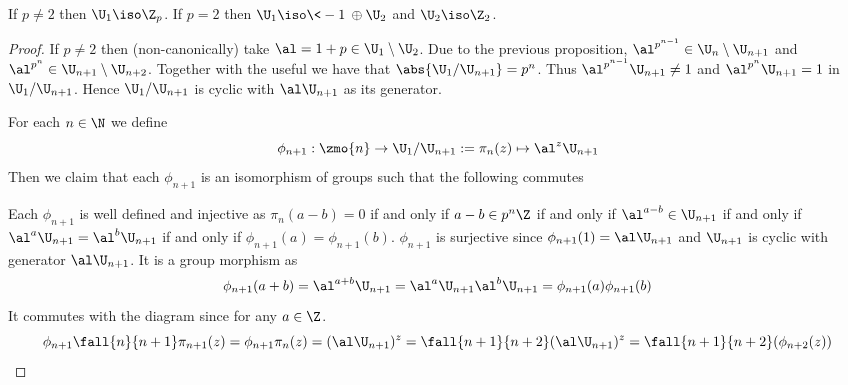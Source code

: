 \begin{prop}[Decomposition of $\U_1$]
    If $p \ne 2$ then $\U_1 \iso \Z_p$.
    If $p = 2$ then $\U_1 \iso \<-1\>\oplus \U_2$ 
    and $\U_2 \iso \Z_2$.
\end{prop}
\begin{proof}
    If $p \ne 2$ then (non-canonically) take 
    $\al = 1 + p \in \U_1 \setminus \U_2$.
    Due to the previous proposition, 
    $\al^{p^{n-1}} \in \U_{n} \setminus \U_{n+1}$
    and $\al^{p^n} \in \U_{n+1} \setminus \U_{n+2}$.
    Together with the useful 
    we have that $\abs{\U_1 / \U_{n+1}} = p^n$.
    Thus $\al^{p^{n-1}} \U_{n+1} \ne 1$
    and $\al^{p^n} \U_{n+1} = 1$ in $\U_1 / \U_{n+1}$.
    Hence $\U_1 / \U_{n+1}$ is cyclic with $\al \U_{n+1}$
    as its generator.

    For each $n \in \N$ we define 
    \[\phi_{n+1} : \zmo{n} \to \U_1 / \U_{n+1}
    : = \pi_n(z) \mapsto \al^z \U_{n+1}\]
    Then we claim that each $\phi_{n+1}$ 
    is an isomorphism of groups such that the following 
    commutes 
    \begin{center}
    \end{center}
    Each $\phi_{n+1}$ is well defined and injective as 
    $\pi_n(a - b) = 0$ if and only if $a - b \in p^n \Z$
    if and only if $\al^{a - b} \in \U_{n+1}$
    if and only if $\al^{a}\U_{n+1} = \al^{b}\U_{n+1}$
    if and only if $\phi_{n+1}(a) = \phi_{n+1}(b)$.
    $\phi_{n+1}$ is surjective since $\phi_{n+1}(1) = \al \U_{n+1}$
    and $\U_{n+1}$ is cyclic with generator $\al \U_{n+1}$.
    It is a group morphism as
    \[\phi_{n+1}(a+b) = \al^{a+b} \U_{n+1}= 
    \al^{a} \U_{n+1} \al^b \U_{n+1}= 
    \phi_{n+1}(a)\phi_{n+1}(b)\]
    It commutes with the diagram since for any $a \in \Z$.
    \[\phi_{n+1} \fall{n}{n+1} \pi_{n+1}(z) = 
    \phi_{n+1} \pi_{n}(z) = 
    (\al \U_{n+1})^z = 
    \fall{n+1}{n+2}(\al \U_{n+1})^z = 
    \fall{n+1}{n+2}(\phi_{n+2}(z))\]
    

\end{proof}
